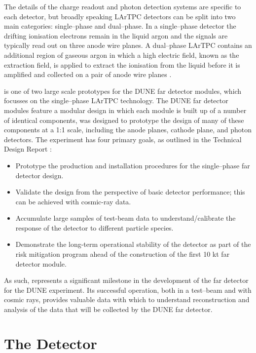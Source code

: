 The details of the charge readout and photon detection systems are specific to 
each detector, but broadly speaking LArTPC detectors can be split into two 
main categories: single--phase and dual--phase. In a single--phase detector the
drifting ionisation electrons remain in the liquid argon and the signals are 
typically read out on three anode wire planes. A dual--phase LArTPC contains an
additional region of gaseous argon in which a high electric field, known as the
extraction field, is applied to extract the ionisation from the liquid 
before it is amplified and collected on a pair of anode wire planes 
\cite{Abi:2020wmh}.

\bigskip

\protodune{} is one of two large scale prototypes for the DUNE far detector
modules, which focusses on the single--phase LArTPC technology. The DUNE far
detector modules feature a modular design in which each module is built up of a
number of identical components, \protodune{} was designed to prototype the
design of many of these components at a 1:1 scale, including the anode planes,
cathode plane, and photon detectors. The \protodune{} experiment has four 
primary goals, as outlined in the Technical Design Report \cite{Abi2017}:
\begin{itemize}
	\item Prototype the production and installation procedures for the
		single--phase far detector design.
	\item Validate the design from the perspective of basic detector performance;
		this can be achieved with cosmic-ray data. 
	\item Accumulate large samples of test-beam data to understand/calibrate the
		response of the detector to different particle species.
	\item Demonstrate the long-term operational stability of the detector as part
		of the risk mitigation program ahead of the construction of the first 10 kt
		far detector module.
\end{itemize}
As such, \protodune{} represents a significant milestone in the development of
the far detector for the DUNE experiment. Its successful operation, both in a 
test--beam and with cosmic rays, provides valuable data with which to understand
reconstruction and analysis of the data that will be collected by the DUNE far 
detector.

\section{The \protodune{} Detector} \label{sec:pdsp_detector}

